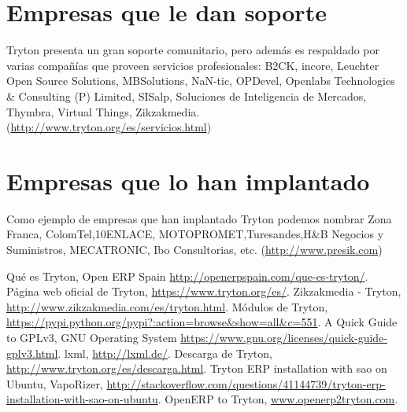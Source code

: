 \documentclass{article}
\begin{document}

\section{Empresas que le dan soporte}

Tryton presenta un gran soporte comunitario, pero además es respaldado por varias compañías que proveen servicios profesionales:
B2CK, incore, Leuchter Open Source Solutions, MBSolutions, NaN-tic, OPDevel, Openlabs Technologies  \& Consulting (P) Limited, SISalp, Soluciones de Inteligencia de Mercados, Thymbra,
Virtual Things, Zikzakmedia.(\url{http://www.tryton.org/es/servicios.html})


\section{Empresas que lo han implantado}
Como ejemplo de empresas que han implantado Tryton podemos nombrar Zona Franca, ColomTel,10ENLACE, MOTOPROMET,Turesandes,H\&B Negocios y Suministros, MECATRONIC, Ibo Consultorias, etc.
(\url{http://www.presik.com})

\begin{thebibliography}{99}
 Qué es Tryton, Open ERP Spain \url{http://openerpspain.com/que-es-tryton/}.
 Página web oficial de Tryton, \url{https://www.tryton.org/es/}.
 Zikzakmedia - Tryton, \url{http://www.zikzakmedia.com/es/tryton.html}.
 Módulos de Tryton, \url{https://pypi.python.org/pypi?:action=browse&show=all&c=551}.
 A Quick Guide to GPLv3, GNU Operating System \url{https://www.gnu.org/licenses/quick-guide-gplv3.html}.
 lxml, \url{http://lxml.de/}.
 Descarga de Tryton, \url{http://www.tryton.org/es/descarga.html}.
 Tryton ERP installation with sao on Ubuntu, VapoRizer, \url{http://stackoverflow.com/questions/41144739/tryton-erp-installation-with-sao-on-ubuntu}.
 OpenERP to Tryton, \url{www.openerp2tryton.com}.

\end{thebibliography}
\end{document}
